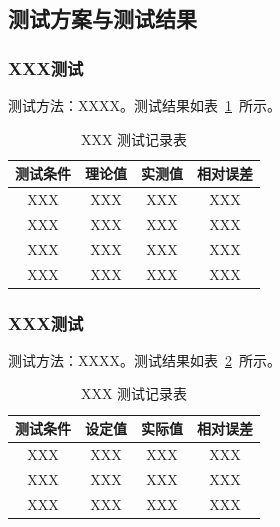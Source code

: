 \documentclass[a4paper, zihao=-4, linespread=1.5, AutoFakeBold]{ctexart}
\newcommand{\题号}[1]{\def\theProblemNum{#1}}
\newcommand{\参赛编号}[1]{\def\theTeamNum{#1}}
\newcommand{\队员}[1]{\def\theMembers{#1}}
\begin{document}
\subsection{测试方案与测试结果}

\subsubsection{XXX测试}

测试方法：XXXX。测试结果如表~\ref{tab:test1}~所示。

\begin{table}[H]
    \centering
    \caption{XXX 测试记录表}
    \label{tab:test1}
    \begin{tabular}{cccc}
        \toprule
        \textbf{测试条件} & \textbf{理论值} & \textbf{实测值} & \textbf{相对误差} \\
        \midrule
        XXX & XXX & XXX & XXX \\
        XXX & XXX & XXX & XXX \\
        XXX & XXX & XXX & XXX \\
        XXX & XXX & XXX & XXX \\
        \bottomrule
    \end{tabular}
\end{table}

\subsubsection{XXX测试}

测试方法：XXXX。测试结果如表~\ref{tab:test2}~所示。

\begin{table}[H]
    \centering
    \caption{XXX 测试记录表}
    \label{tab:test2}
    \begin{tabular}{cccc}
        \toprule
        \textbf{测试条件} & \textbf{设定值} & \textbf{实际值} & \textbf{相对误差} \\
        \midrule
        XXX & XXX & XXX & XXX \\
        XXX & XXX & XXX & XXX \\
        XXX & XXX & XXX & XXX \\
        \bottomrule
    \end{tabular}
\end{table}

\end{document}

